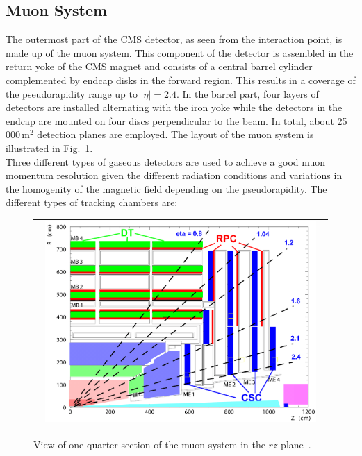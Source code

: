 \subsection{Muon System}
\label{subsec:cms_muon}
The outermost part of the CMS detector, as seen from the interaction point, is made up of the muon system. This component of the detector is assembled in the return yoke of the CMS magnet and consists of a central barrel cylinder complemented by endcap disks in the forward region. This results in a coverage of the pseudorapidity range up to $|\eta| = 2.4$. In the barrel part, four layers of detectors are installed alternating with the iron yoke while the detectors in the endcap are mounted on four discs perpendicular to the beam. In total, about 25\,000\,$\mathrm{m}^2$ detection planes are employed. The layout of the muon system is illustrated in Fig.~\ref{fig:CMS_muon}. \\
Three different types of gaseous detectors are used to achieve a good muon momentum resolution given the different radiation conditions and variations in the homogenity of the magnetic field depending on the pseudorapidity. The different types of tracking chambers are:
\begin{figure}[!tp]
  \centering
  \begin{tabular}{c}
    \includegraphics[width=0.95\textwidth]{figures/Figures_Experimental_Apparatus_MuonDetector.png}
  \end{tabular}
  \caption{View of one quarter section of the muon system in the $rz$-plane~\cite{bib:cmsptdr1}.}
  \label{fig:CMS_muon}
\end{figure}

